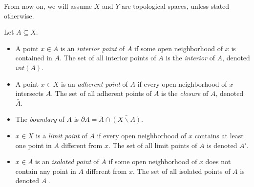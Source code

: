     From now on, we will assume $X$ and $Y$ are topological spaces, unless stated otherwise.
    
    \begin{defn} \label{def_topology_points}
        Let $A \subseteq X$. \begin{itemize}
            \item A point $x \in A$ is an \emph{interior point} of $A$ if some open neighborhood of $x$ is contained in $A$. The set of all interior points of $A$ is the \emph{interior} of $A$, denoted $int(A)$.
            \item A point $x \in X$ is an \emph{adherent point} of $A$ if every open neighborhood of $x$ intersects $A$. The set of all adherent points of $A$ is the \emph{closure} of $A$, denoted $\bar{A}$.
            \item The \emph{boundary} of $A$ is $\partial A = \bar{A} \cap \bar{(X \backslash A)}$.
            \item $x \in X$ is a \emph{limit point} of $A$ if every open neighborhood of $x$ contains at least one point in $A$ different from $x$. The set of all limit points of $A$ is denoted $A'$.
            \item $x \in A$ is an \emph{isolated point} of $A$ if some open neighborhood of $x$ does not contain any point in $A$ different from $x$. The set of all isolated points of $A$ is denoted $A^\cdot$.
    \end{itemize} \end{defn}

